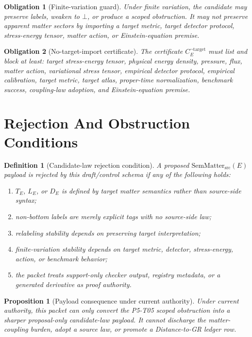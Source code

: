 \documentclass[11pt]{article}
\newtheorem{definition}{Definition}
\newtheorem{proposition}{Proposition}
\newtheorem{obligation}{Obligation}
\newcommand{\SemMatterSrc}{\mathrm{SemMatter}_{\mathrm{src}}}
\newcommand{\Bottom}{\bot}
\begin{document}
\begin{obligation}[Finite-variation guard]
Under finite variation, the candidate may preserve labels, weaken to
\(\Bottom\), or produce a scoped obstruction.  It may not preserve apparent
matter sectors by importing a target metric, target detector protocol,
stress-energy tensor, matter action, or Einstein-equation premise.
\end{obligation}

\begin{obligation}[No-target-import certificate]
The certificate \(C^{\neg\mathrm{target}}_E\) must list and block at least:
target stress-energy tensor, physical energy density, pressure, flux,
matter action, variational stress tensor, empirical detector protocol,
empirical calibration, target metric, target atlas, proper-time normalization,
benchmark success, coupling-law adoption, and Einstein-equation premise.
\end{obligation}

\section{Rejection And Obstruction Conditions}

\begin{definition}[Candidate-law rejection condition]
A proposed \(\SemMatterSrc(E)\) payload is rejected by this draft/control
schema if any of the following holds:

\begin{enumerate}
\item \(T_E\), \(L_E\), or \(D_E\) is defined by target matter semantics rather
  than source-side syntax;
\item non-bottom labels are merely explicit tags with no source-side law;
\item relabeling stability depends on preserving target interpretation;
\item finite-variation stability depends on target metric, detector,
  stress-energy, action, or benchmark behavior;
\item the packet treats support-only checker output, registry metadata, or a
  generated derivative as proof authority.
\end{enumerate}
\end{definition}

\begin{proposition}[Payload consequence under current authority]
Under current authority, this packet can only convert the P5-T05 scoped
obstruction into a sharper proposal-only candidate-law payload.  It cannot
discharge the matter-coupling burden, adopt a source law, or promote a
Distance-to-GR ledger row.
\end{proposition}
\end{document}
